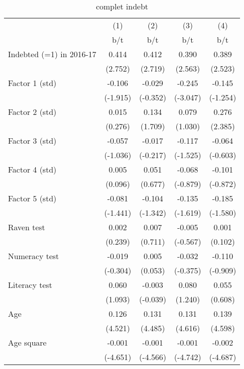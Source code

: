  

    \begin{longtable}{lcccc}
 \raggedright 
  \caption{complet indebt}
    \label{tab:addlabel}%

    \toprule
          & (1)   & (2)   & (3)   & (4) \\
\cmidrule{2-5}          & b/t   & b/t   & b/t   & b/t \\
    \midrule
    Indebted (=1) in 2016-17 & 0.414 & 0.412 & 0.390 & 0.389 \\
          & (2.752) & (2.719) & (2.563) & (2.523) \\
    Factor 1 (std) & -0.106 & -0.029 & -0.245 & -0.145 \\
          & (-1.915) & (-0.352) & (-3.047) & (-1.254) \\
    Factor 2 (std) & 0.015 & 0.134 & 0.079 & 0.276 \\
          & (0.276) & (1.709) & (1.030) & (2.385) \\
    Factor 3 (std) & -0.057 & -0.017 & -0.117 & -0.064 \\
          & (-1.036) & (-0.217) & (-1.525) & (-0.603) \\
    Factor 4 (std) & 0.005 & 0.051 & -0.068 & -0.101 \\
          & (0.096) & (0.677) & (-0.879) & (-0.872) \\
    Factor 5 (std) & -0.081 & -0.104 & -0.135 & -0.185 \\
          & (-1.441) & (-1.342) & (-1.619) & (-1.580) \\
    Raven test & 0.002 & 0.007 & -0.005 & 0.001 \\
          & (0.239) & (0.711) & (-0.567) & (0.102) \\
    Numeracy test & -0.019 & 0.005 & -0.032 & -0.110 \\
          & (-0.304) & (0.053) & (-0.375) & (-0.909) \\
    Literacy test & 0.060 & -0.003 & 0.080 & 0.055 \\
          & (1.093) & (-0.039) & (1.240) & (0.608) \\
    Age   & 0.126 & 0.131 & 0.131 & 0.139 \\
          & (4.521) & (4.485) & (4.616) & (4.598) \\
    Age square & -0.001 & -0.001 & -0.001 & -0.002 \\
          & (-4.651) & (-4.566) & (-4.742) & (-4.687) \\

\end{longtable}

